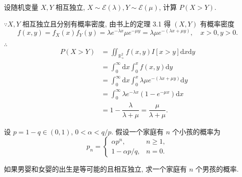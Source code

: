 \documentclass{ctexart}
\begin{document}
\addtocounter{exercise}{2}
\begin{exercise}%
    设随机变量 $X,Y$ 相互独立, $X\sim\mathcal{E}(\lambda),Y\sim\mathcal{E}(\mu)$, 计算 $P(X>Y)$.
\end{exercise}
\begin{solution}
    $\because X,Y$ 相互独立且分别有概率密度, 由书上的定理 3.1 得 $(X,Y)$ 有概率密度
    \[f(x,y)=f_X(x)f_Y(y)=\lambda e^{-\lambda x}\mu e^{-\mu y}=\lambda\mu e^{-(\lambda x+\mu y)},\quad x>0,y>0.\]

    $\therefore$
    \begin{align*}
        P(X>Y) & =\iint_{\mathbb{R}_+^2}f(x,y)I[x>y]\mathrm{d}x\mathrm{d}y \\
        & =\int_0^\infty\mathrm{d}x\int_0^xf(x,y)\mathrm{d}y \\
        & =\int_0^\infty\mathrm{d}x\int_0^x\lambda\mu e^{-(\lambda x+\mu y)}\mathrm{d}y \\
        & =\int_0^\infty\lambda e^{-\lambda x}(1-e^{-\mu x})\mathrm{d}x \\
        & =1-\dfrac{\lambda}{\lambda+\mu}=\dfrac{\mu}{\lambda+\mu}.
    \end{align*}
\end{solution}
\begin{exercise}%
    设 $p=1-q\in(0,1)$, $0<\alpha<q/p$. 假设一个家庭有 $n$ 个小孩的概率为
    \[p_n=\begin{cases}
        \alpha p^n, & n\geq 1, \\
        1-\alpha p/q, & n=0.
    \end{cases}\]

    如果男婴和女婴的出生是等可能的且相互独立, 求一个家庭有 $n$ 个男孩的概率.
\end{exercise}
\end{document}
